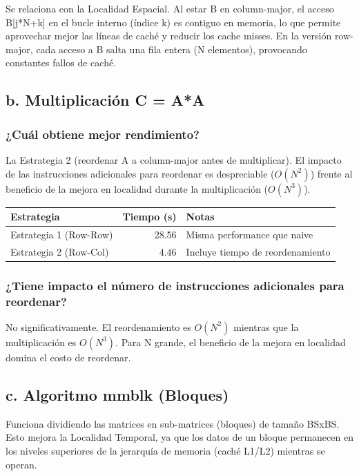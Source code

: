 \documentclass[11pt,a4paper]{article}
\begin{document}
Se relaciona con la Localidad Espacial. Al estar B en column-major, el acceso B[j*N+k] en el bucle interno (índice k) es contiguo en memoria, lo que permite aprovechar mejor las líneas de caché y reducir los cache misses. En la versión row-major, cada acceso a B salta una fila entera (N elementos), provocando constantes fallos de caché.

\subsection*{b. Multiplicación C = A*A}

\subsubsection*{¿Cuál obtiene mejor rendimiento?}

La Estrategia 2 (reordenar A a column-major antes de multiplicar). El impacto de las instrucciones adicionales para reordenar es despreciable ($O(N^2)$) frente al beneficio de la mejora en localidad durante la multiplicación ($O(N^3)$).

\begin{center}
\begin{tabular}{|l|r|l|}
\hline
\textbf{Estrategia} & \textbf{Tiempo (s)} & \textbf{Notas} \\
\hline
Estrategia 1 (Row-Row) & 28.56 & Misma performance que naive \\
Estrategia 2 (Row-Col) & 4.46 & Incluye tiempo de reordenamiento \\
\hline
\end{tabular}
\end{center}

\subsubsection*{¿Tiene impacto el número de instrucciones adicionales para reordenar?}

No significativamente. El reordenamiento es $O(N^2)$ mientras que la multiplicación es $O(N^3)$. Para N grande, el beneficio de la mejora en localidad domina el costo de reordenar.

\subsection*{c. Algoritmo mmblk (Bloques)}

Funciona dividiendo las matrices en sub-matrices (bloques) de tamaño BSxBS. Esto mejora la Localidad Temporal, ya que los datos de un bloque permanecen en los niveles superiores de la jerarquía de memoria (caché L1/L2) mientras se operan.
\end{document}
